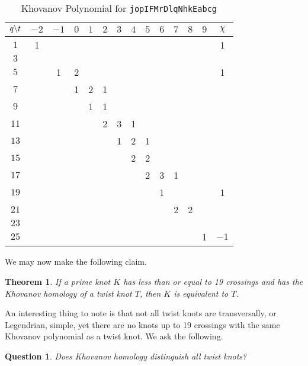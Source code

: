 \documentclass{article}
\theoremstyle{plain}
\newtheorem{theorem}{Theorem}
\newtheorem{question}{Question}
\begin{document}
        \begin{table}[H]
            \centering
            \begin{tabular}{| c | c | c | c | c | c | c | c | c | c | c | c | c | c |}
                \hline
                $q\symbol{92}t$&$-2$&$-1$&$0$&$1$&$2$&$3$&$4$&$5$&$6$&$7$&$8$&$9$&$\chi$\\
                \hline
                $1$&1&&&&&&&&&&&&1\\
                \hline
                $3$&&&&&&&&&&&&&\\
                \hline
                $5$&&1&2&&&&&&&&&&1\\
                \hline
                $7$&&&1&2&1&&&&&&&&\\
                \hline
                $9$&&&&1&1&&&&&&&&\\
                \hline
                $11$&&&&&2&3&1&&&&&&\\
                \hline
                $13$&&&&&&1&2&1&&&&&\\
                \hline
                $15$&&&&&&&2&2&&&&&\\
                \hline
                $17$&&&&&&&&2&3&1&&&\\
                \hline
                $19$&&&&&&&&&1&&&&1\\
                \hline
                $21$&&&&&&&&&&2&2&&\\
                \hline
                $23$&&&&&&&&&&&&&\\
                \hline
                $25$&&&&&&&&&&&&1&$-1$\\
                \hline
            \end{tabular}
            \caption{Khovanov Polynomial for \texttt{jopIFMrDlqNhkEabcg}}
            \label{table:jopIFMrDlqNhkEabcg_kho}
        \end{table}
        We may now make the following claim.
        \begin{theorem}
            If a prime knot $K$ has less than or equal to 19 crossings and has
            the Khovanov homology of a twist knot $T$,
            then $K$ is equivalent to $T$.
        \end{theorem}
        An interesting thing to note is that not all twist knots are
        transversally, or Legendrian, simple, yet there are no knots up to
        19 crossings with the same Khovanov polynomial as a twist knot. We
        ask the following.
        \begin{question}
            Does Khovanov homology distinguish all twist knots?
        \end{question}
\end{document}
